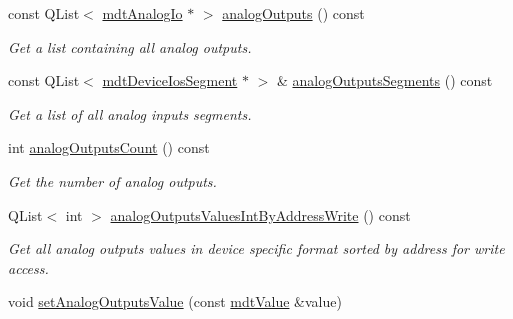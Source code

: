 \begin{DoxyCompactItemize}
const QList$<$ \hyperlink{classmdt_analog_io}{mdtAnalogIo} $\ast$ $>$ \hyperlink{classmdt_device_ios_aa4ddc48f9e3258adc7222ef3481a518e}{analogOutputs} () const 
\begin{DoxyCompactList}\small\item\em Get a list containing all analog outputs. \end{DoxyCompactList}\item 
\hypertarget{classmdt_device_ios_afc425a36dd8942a507d993993bc141a9}{
const QList$<$ \hyperlink{classmdt_device_ios_segment}{mdtDeviceIosSegment} $\ast$ $>$ \& \hyperlink{classmdt_device_ios_afc425a36dd8942a507d993993bc141a9}{analogOutputsSegments} () const }
\label{classmdt_device_ios_afc425a36dd8942a507d993993bc141a9}

\begin{DoxyCompactList}\small\item\em Get a list of all analog inputs segments. \end{DoxyCompactList}\item 
\hypertarget{classmdt_device_ios_a8b9b14c4968e5aaae60ac7f91f77e06c}{
int \hyperlink{classmdt_device_ios_a8b9b14c4968e5aaae60ac7f91f77e06c}{analogOutputsCount} () const }
\label{classmdt_device_ios_a8b9b14c4968e5aaae60ac7f91f77e06c}

\begin{DoxyCompactList}\small\item\em Get the number of analog outputs. \end{DoxyCompactList}\item 
\hypertarget{classmdt_device_ios_afc343f9733f297ee6359455f15308341}{
QList$<$ int $>$ \hyperlink{classmdt_device_ios_afc343f9733f297ee6359455f15308341}{analogOutputsValuesIntByAddressWrite} () const }
\label{classmdt_device_ios_afc343f9733f297ee6359455f15308341}

\begin{DoxyCompactList}\small\item\em Get all analog outputs values in device specific format sorted by address for write access. \end{DoxyCompactList}\item 
\hypertarget{classmdt_device_ios_a5d3edb5c95163dbe88ab5f17b6175f2b}{
void \hyperlink{classmdt_device_ios_a5d3edb5c95163dbe88ab5f17b6175f2b}{setAnalogOutputsValue} (const \hyperlink{classmdt_value}{mdtValue} \&value)}
\label{classmdt_device_ios_a5d3edb5c95163dbe88ab5f17b6175f2b}


\end{DoxyCompactItemize}
